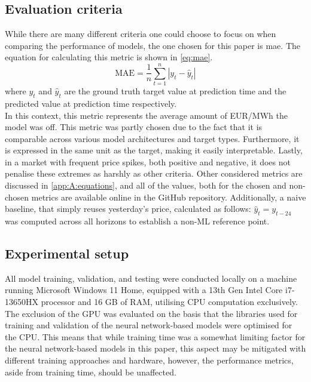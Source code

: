 \subsection{Evaluation criteria}\label{sec:evaluationCriteria}
While there are many different criteria one could choose to focus on when 
comparing the performance of models, the one chosen for this paper is 
\gls{mae}. The equation for calculating this metric is shown in 
\autoref{eq:mae}.
\begin{equation}
	\text{MAE} = \frac{1}{n} \sum_{t=1}^{n} |y_t - \hat{y}_t|
	\label{eq:mae}
\end{equation}
where $y_t$ and $\hat{y}_t$ are the ground truth target value at 
prediction time 
and the predicted value at prediction time respectively.\\ 
In this context, this metric represents the average amount of EUR/MWh 
the model was off. This metric was partly chosen due to the fact that it 
is comparable across various model architectures and target types. 
Furthermore, it is expressed in the same unit as the target, making it 
easily interpretable. Lastly, in a market with frequent price spikes, 
both positive and negative, it does not penalise 
these extremes as 
harshly as other criteria. Other considered metrics are discussed in 
\cref{app:A:equations}, and all of the values, both for the chosen and 
non-chosen metrics are available online in the GitHub repository. 
Additionally, a naive baseline, that simply reuses yesterday's price, 
calculated as follows: $\hat{y}_t = y_{t-24}$ was computed across all 
horizons to establish a non-ML reference point. 

\subsection{Experimental setup}
All model training, validation, and testing were conducted locally on a machine 
running Microsoft Windows 11 Home, equipped with a 13th Gen Intel Core 
i7-13650HX processor and 16 GB of RAM, utilising 
CPU computation exclusively. 
The exclusion of the GPU was evaluated on the basis that the libraries used for 
training and validation of the neural network-based models were optimised for 
the CPU. This means that while training time was a somewhat limiting factor for 
the neural network-based models in this paper, this aspect may be mitigated 
with different training approaches and hardware, however, the performance 
metrics, aside from training time, should be unaffected.

